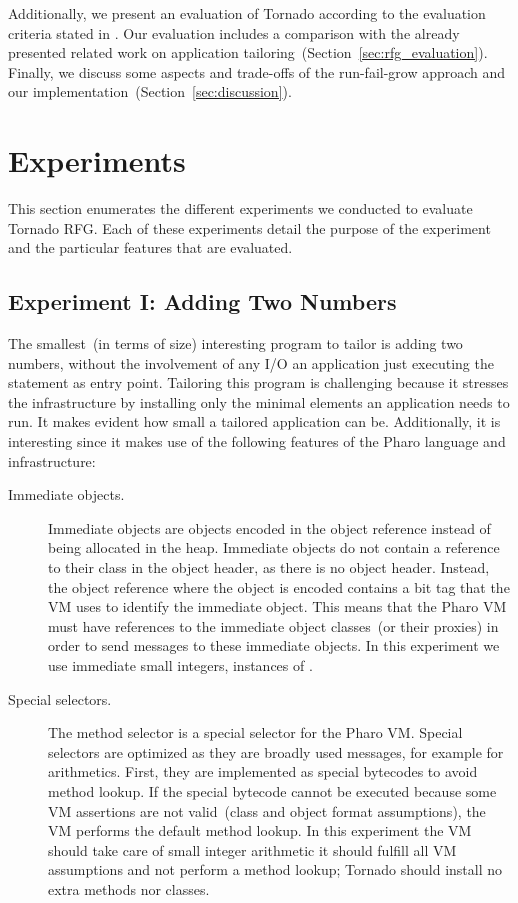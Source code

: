 Additionally, we present an evaluation of Tornado according to the evaluation criteria stated in . Our evaluation includes a comparison with the already presented related work on application tailoring~(Section~\ref{sec:rfg_evaluation}).
Finally, we discuss some aspects and trade-offs of the run-fail-grow approach and our implementation~(Section~\ref{sec:discussion}).

\section{Experiments}\label{sec:rfg_experiments}

This section enumerates the different experiments we conducted to evaluate Tornado RFG. Each of these experiments detail the purpose of the experiment and the particular features that are evaluated.

\subsection*{Experiment I: Adding Two Numbers}

The smallest~(in terms of size) interesting program to tailor is adding two numbers, without the involvement of any I/O \ie an application just executing the  statement as entry point. Tailoring this program is challenging because it stresses the infrastructure by installing only the minimal elements an application needs to run. It makes evident how small a tailored application can be. Additionally, it is interesting since it makes use of the following features of the Pharo language and infrastructure:

\begin{description}
\item[Immediate objects.] Immediate objects are objects encoded in the object reference instead of being allocated in the heap. Immediate objects do not contain a reference to their class in the object header, as there is no object header. Instead, the object reference where the object is encoded contains a bit tag that the VM uses to identify the immediate object. This means that the Pharo VM must have references to the immediate object classes~(or their proxies) in order to send messages to these immediate objects. In this experiment we use immediate small integers, instances of .
\item[Special selectors.] The method selector \ct{+} is a special selector for the Pharo VM. Special selectors are optimized as they are broadly used messages, for example for arithmetics. First, they are implemented as special bytecodes to avoid method lookup. If the special bytecode cannot be executed because some VM assertions are not valid~(\eg class and object format assumptions), the VM performs the default method lookup. In this experiment the VM should take care of small integer arithmetic \ie it should fulfill all VM assumptions and not perform a method lookup; Tornado should install no extra methods nor classes.
\end{description}

